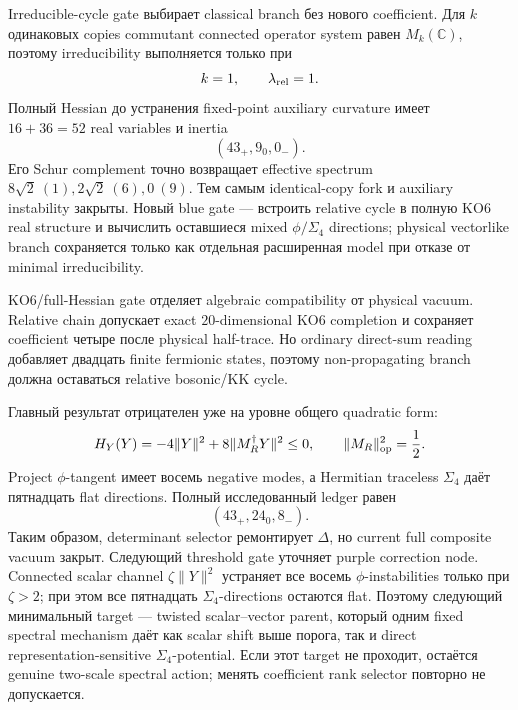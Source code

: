 Irreducible-cycle gate выбирает classical branch без нового coefficient.
Для \(k\) одинаковых copies commutant connected operator system равен
\(M_k(\mathbb C)\), поэтому irreducibility выполняется только при
\begin{equation}
 k=1,
 \qquad
 \lambda_{\rm rel}=1.
\end{equation}
Полный Hessian до устранения fixed-point auxiliary curvature имеет
\(16+36=52\) real variables и inertia
\begin{equation}
 (43_+,9_0,0_-).
\end{equation}
Его Schur complement точно возвращает effective spectrum
\(8\sqrt2\ (1),2\sqrt2\ (6),0\ (9)\). Тем самым identical-copy fork и
auxiliary instability закрыты. Новый blue gate --- встроить relative cycle
в полную KO6 real structure и вычислить оставшиеся mixed
\(\phi/\Sigma_4\) directions; physical vectorlike branch сохраняется только
как отдельная расширенная model при отказе от minimal irreducibility.

KO6/full-Hessian gate отделяет algebraic compatibility от physical vacuum.
Relative chain допускает exact \(20\)-dimensional KO6 completion и сохраняет
coefficient четыре после physical half-trace. Но ordinary direct-sum reading
добавляет двадцать finite fermionic states, поэтому non-propagating branch
должна оставаться relative bosonic/KK cycle.

Главный результат отрицателен уже на уровне общего quadratic form:
\begin{equation}
 H_Y(Y)=-4\|Y\|^2+8\|M_R^\dagger Y\|^2\le0,
 \qquad
 \|M_R\|_{\rm op}^2=\frac12.
\end{equation}
Project \(\phi\)-tangent имеет восемь negative modes, а Hermitian traceless
\(\Sigma_4\) даёт пятнадцать flat directions. Полный исследованный ledger
равен
\begin{equation}
 (43_+,24_0,8_-).
\end{equation}
Таким образом, determinant selector ремонтирует \(\Delta\), но current full
composite vacuum закрыт. Следующий threshold gate уточняет purple correction
node. Connected scalar channel \(\zeta\|Y\|^2\) устраняет все восемь
\(\phi\)-instabilities только при \(\zeta>2\); при этом все пятнадцать
\(\Sigma_4\)-directions остаются flat. Поэтому следующий минимальный target
--- twisted scalar--vector parent, который одним fixed spectral mechanism
даёт как scalar shift выше порога, так и direct representation-sensitive
\(\Sigma_4\)-potential. Если этот target не проходит, остаётся genuine
two-scale spectral action; менять coefficient rank selector повторно не
допускается.

